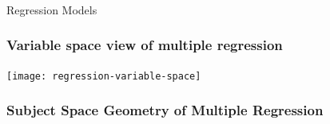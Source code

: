 \documentclass{beamer}
\begin{document}

\begin{frame}
  \frametitle{}

\begin{center}
\begin{Huge}
Regression Models
\end{Huge}
\end{center}
\end{frame}

\begin{frame}[fragile]
  \frametitle{Variable space view of multiple regression}

\begin{center}
\texttt{[image: regression-variable-space]}
\end{center}


\end{frame}


\begin{frame}
  \frametitle{Subject Space Geometry of Multiple Regression}

\begin{center}

\end{center}
\end{frame}
\end{document}
